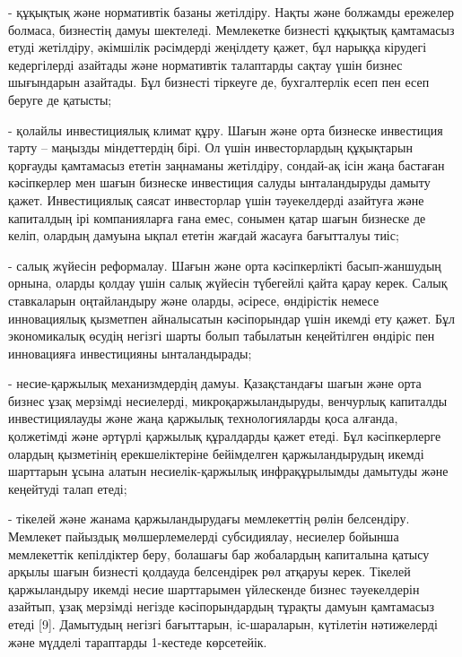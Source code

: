 \begin{multicols}{2}
- құқықтық және нормативтік базаны жетілдіру. Нақты және болжамды
ережелер болмаса, бизнестің дамуы шектеледі. Мемлекетке бизнесті
құқықтық қамтамасыз етуді жетілдіру, әкімшілік рәсімдерді жеңілдету
қажет, бұл нарыққа кірудегі кедергілерді азайтады және нормативтік
талаптарды сақтау үшін бизнес шығындарын азайтады. Бұл бизнесті тіркеуге
де, бухгалтерлік есеп пен есеп беруге де қатысты;

- қолайлы инвестициялық климат құру. Шағын және орта бизнеске инвестиция
тарту -- маңызды міндеттердің бірі. Ол үшін инвесторлардың құқықтарын
қорғауды қамтамасыз ететін заңнаманы жетілдіру, сондай-ақ ісін жаңа
бастаған кәсіпкерлер мен шағын бизнеске инвестиция салуды ынталандыруды
дамыту қажет. Инвестициялық саясат инвесторлар үшін тәуекелдерді
азайтуға және капиталдың ірі компанияларға ғана емес, сонымен қатар
шағын бизнеске де келіп, олардың дамуына ықпал ететін жағдай жасауға
бағытталуы тиіс;

- салық жүйесін реформалау. Шағын және орта кәсіпкерлікті басып-жаншудың
орнына, оларды қолдау үшін салық жүйесін түбегейлі қайта қарау керек.
Салық ставкаларын оңтайландыру және оларды, әсіресе, өндірістік немесе
инновациялық қызметпен айналысатын кәсіпорындар үшін икемді ету қажет.
Бұл экономикалық өсудің негізгі шарты болып табылатын кеңейтілген
өндіріс пен инновацияға инвестицияны ынталандырады;

- несие-қаржылық механизмдердің дамуы. Қазақстандағы шағын және орта
бизнес ұзақ мерзімді несиелерді, микроқаржыландыруды, венчурлық
капиталды инвестициялауды және жаңа қаржылық технологияларды қоса
алғанда, қолжетімді және әртүрлі қаржылық құралдарды қажет етеді. Бұл
кәсіпкерлерге олардың қызметінің ерекшеліктеріне бейімделген
қаржыландырудың икемді шарттарын ұсына алатын несиелік-қаржылық
инфрақұрылымды дамытуды және кеңейтуді талап етеді;

- тікелей және жанама қаржыландырудағы мемлекеттің рөлін белсендіру.
Мемлекет пайыздық мөлшерлемелерді субсидиялау, несиелер бойынша
мемлекеттік кепілдіктер беру, болашағы бар жобалардың капиталына қатысу
арқылы шағын бизнесті қолдауда белсендірек рөл атқаруы керек. Тікелей
қаржыландыру икемді несие шарттарымен үйлескенде бизнес тәуекелдерін
азайтып, ұзақ мерзімді негізде кәсіпорындардың тұрақты дамуын қамтамасыз
етеді {[}9{]}. Дамытудың негізгі бағыттарын, іс-шараларын, күтілетін
нәтижелерді және мүдделі тараптарды 1-кестеде көрсетейік.
\end{multicols}

